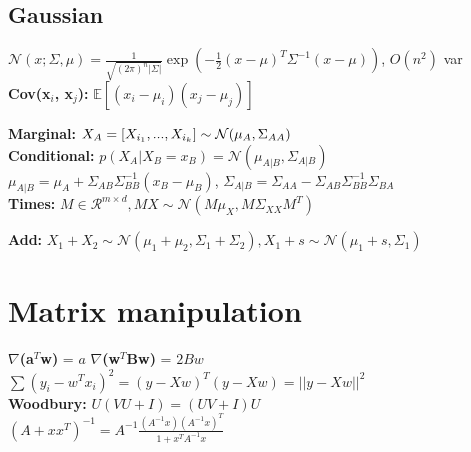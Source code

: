 \subsection{Gaussian}
$\mathcal{N}(x;\Sigma,\mu) = \frac{1}{\sqrt{(2\pi)^{n} |\Sigma|}} \exp(-\frac{1}{2}(x-\mu)^T \Sigma^{-1} (x-\mu))$, $O(n^2)$ var\\
\textbf{Cov(x$_i$, x$_j$):} $\mathbb{E}[(x_i-\mu_i)(x_j-\mu_j)]$\\
\begin{comment}
	The Gaussian is very important due to the ease of manipulation and the fact, that all distributions are driven towards a gaussian as stated in the central limit theorem.\\
	\textbf{Dimensionality:} For a usual distribution with n parameters, e.g. binary $P(X_1,..,X_n)$, we need $2^n-1$ variables. With a compositional Gaussian only $O(n^2)$.\\
	\textbf{Marginalization:} The cost of marginalisation is also huge with standart (binary distributions), need to sum up all combinations of other variables $O(2^{n-1)})$.\\
\end{comment}

\textbf{Marginal:} $X_A = [X_{i_1},...,X_{i_k}] \sim \mathcal{N}(\mu_A, \Sigma_{AA})$\\

\textbf{Conditional:} $p(X_A | X_B = x_B) = \mathcal{N}(\mu_{A|B}, \Sigma_{A|B})$\\ 
$\mu_{A|B} = \mu_A + \Sigma_{AB}\Sigma^{-1}_{BB}(x_B - \mu_B)$, $\Sigma_{A|B} = \Sigma_{AA} - \Sigma_{AB}\Sigma^{-1}_{BB} \Sigma_{BA}$\\

\textbf{Times:} $M \in \mathcal{R}^{m\times d}, MX \sim \mathcal{N}(M\mu_X, M\Sigma_{XX}M^T)$\\
\begin{comment}
	If we have a scalar instead of M, it reduces to $X_1s \sim \mathcal{N}(s\mu_1, s^2\Sigma_1)$\\
\end{comment}

\textbf{Add:} $X_1 + X_2 \sim \mathcal{N}(\mu_1 + \mu_2, \Sigma_1 + \Sigma_2), X_1+s \sim \mathcal{N}(\mu_1 + s, \Sigma_1)$

\section{Matrix manipulation}
\textbf{$\nabla$(a$^T$w)} = $a$
\textbf{$\nabla$(w$^T$Bw)} = $2Bw$\\
$\sum(y_i - w^T x_i)^2 = (y-Xw)^T(y-Xw) = ||y-Xw||^2$\\
\textbf{Woodbury:} $U(VU + I) = (UV+I)U$\\
 $(A + xx^T)^{-1} = A^{-1} \frac{(A^{-1}x)(A^{-1}x)^T}{1 + x^TA^{-1}x}$\\


